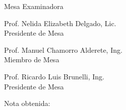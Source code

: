 

\vspace*{3\baselineskip}



\vspace*{3\baselineskip}
\hspace{.1\textwidth} %
\begin{minipage}{.8\textwidth}
		
\end{minipage}

\vspace*{3\baselineskip}
\begin{center}
	Mesa Examinadora\\
	
	\vspace*{1\baselineskip}
	\makebox[3in]{\hrulefill}
	\par\noindent
	Prof. Nelida Elizabeth Delgado, Lic.\\
	Presidente de Mesa\\
	\vspace*{1\baselineskip}
	\makebox[3in]{\hrulefill}
	\par\noindent
	Prof. Manuel Chamorro Alderete, Ing.\\	
	Miembro de Mesa\\
	\vspace*{1\baselineskip}
	\makebox[3in]{\hrulefill}
	\par\noindent
	Prof. Ricardo Luis Brunelli, Ing.\\
	Presidente de Mesa\\
\end{center}
\vspace*{2\baselineskip}
Nota obtenida:



